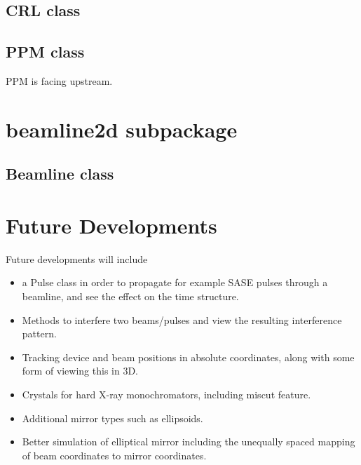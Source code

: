 \documentclass[11pt,fleqn]{article} %
\begin{document}
\subsection{CRL class}

\subsection{PPM class}
PPM is facing upstream.

\section{beamline2d subpackage}

\subsection{Beamline class}\label{beamline}

\section{Future Developments}

Future developments will include
\begin{itemize}
  \item{a Pulse class in order to propagate for example SASE pulses through a beamline, and see the effect on the time structure.}
  \item{Methods to interfere two beams/pulses and view the resulting interference pattern.}
  \item{Tracking device and beam positions in absolute coordinates, along with some form of viewing this in 3D.}
  \item{Crystals for hard X-ray monochromators, including miscut feature.}
  \item{Additional mirror types such as ellipsoids.}
  \item{Better simulation of elliptical mirror including the unequally spaced mapping of beam coordinates to mirror coordinates.}
\end{itemize}
\end{document}
